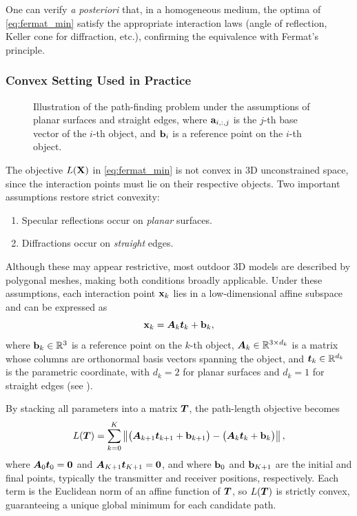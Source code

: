 One can verify \emph{a posteriori} that, in a homogeneous medium, the optima of \eqref{eq:fermat_min} satisfy the appropriate interaction laws (angle of reflection, Keller cone for diffraction, etc.), confirming the equivalence with Fermat's principle.

\subsubsection{Convex Setting Used in Practice}

\begin{figure}
  \caption{Illustration of the path-finding problem under the assumptions of planar surfaces and straight edges, where $\mathbf{a}_{i,:,j}$ is the $j$-th base vector of the $i$-th object, and $\mathbf{b}_i$ is a reference point on the $i$-th object.}
\end{figure}

The objective $L(\mathbf{X})$ in \eqref{eq:fermat_min} is not convex in 3D unconstrained space, since the interaction points must lie on their respective objects. Two important assumptions restore strict convexity:
\begin{enumerate}
  \item Specular reflections occur on \emph{planar} surfaces.
  \item Diffractions occur on \emph{straight} edges.
\end{enumerate}

Although these may appear restrictive, most outdoor 3D models are described by polygonal meshes, making both conditions broadly applicable. Under these assumptions, each interaction point $\mathbf{x}_k$ lies in a low-dimensional affine subspace and can be expressed as
\begin{equation}
  \mathbf{x}_k = \boldsymbol{A}_k\boldsymbol{t}_k + \mathbf{b}_k,
\end{equation}
where $\mathbf{b}_k \in \mathbb{R}^3$ is a reference point on the $k$-th object, $\boldsymbol{A}_k \in \mathbb{R}^{3\times d_k}$ is a matrix whose columns are orthonormal basis vectors spanning the object, and $\boldsymbol{t}_k \in \mathbb{R}^{d_k}$ is the parametric coordinate, with $d_k = 2$ for planar surfaces and $d_k = 1$ for straight edges (see ).

By stacking all parameters into a matrix $\boldsymbol{T}$, the path-length objective becomes
\begin{equation}\label{eq:fermat_param}
  L(\boldsymbol{T}) = \sum_{k=0}^{K} \left\|\bigl(\boldsymbol{A}_{k+1}\boldsymbol{t}_{k+1} + \mathbf{b}_{k+1}\bigr) - \bigl(\boldsymbol{A}_{k}\boldsymbol{t}_{k} + \mathbf{b}_{k}\bigr)\right\|,
\end{equation}
where $\boldsymbol{A}_0\boldsymbol{t}_0 = \boldsymbol{0}$ and $\boldsymbol{A}_{K+1}\boldsymbol{t}_{K+1} = \boldsymbol{0}$, and where $\mathbf{b}_0$ and $\mathbf{b}_{K+1}$ are the initial and final points, typically the transmitter and receiver positions, respectively. Each term is the Euclidean norm of an affine function of $\boldsymbol{T}$, so $L(\boldsymbol{T})$ is strictly convex, guaranteeing a unique global minimum for each candidate path.


